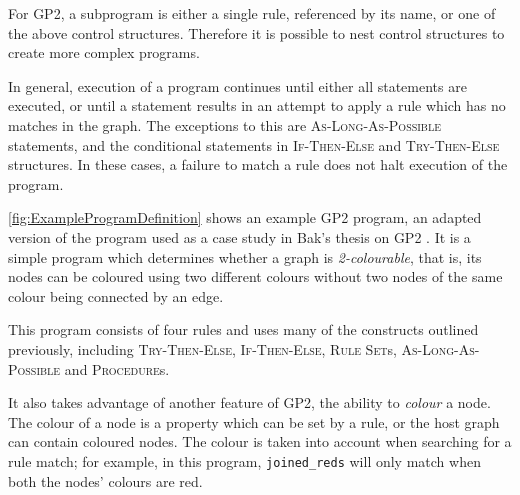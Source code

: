 \documentclass[authoryearcitations]{UoYCSproject}
\begin{document}
For GP2, a subprogram is either a single rule, referenced by its name, or one of
the above control structures. Therefore it is possible to nest control structures
to create more complex programs.

In general, execution of a program continues until either all statements are
executed, or until a statement results in an attempt to apply a rule which has
no matches in the graph. The exceptions to this are \textsc{As-Long-As-Possible}
statements, and the conditional statements in \textsc{If-Then-Else} and
\textsc{Try-Then-Else} structures. In these cases, a failure to match a rule
does not halt execution of the program.

\autoref{fig:ExampleProgramDefinition} shows an example GP2 program, an adapted
version of the program used as a case study in Bak's thesis on GP2 \citep[p.126]{bak2015}.
It is a simple program which determines whether a graph is \emph{2-colourable},
that is, its nodes can be coloured using two different colours without two nodes
of the same colour being connected by an edge.

This program consists of four rules and uses many of the constructs outlined
previously, including \textsc{Try-Then-Else}, \textsc{If-Then-Else},
\textsc{Rule Set}s, \textsc{As-Long-As-Possible} and \textsc{Procedure}s.

It also takes advantage of another feature of GP2, the ability to \emph{colour}
a node. The colour of a node is a property which can be set by a rule, or the
host graph can contain coloured nodes. The colour is taken into account when
searching for a rule match; for example, in this program, \texttt{joined\_reds}
will only match when both the nodes' colours are red.
\end{document}
